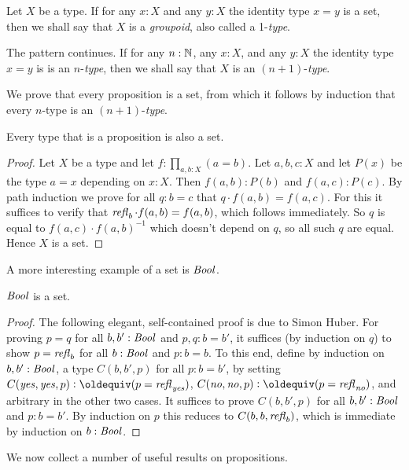 Let $X$ be a type.  If for any $x:X$ and any $y:X$ the identity type $x=y$ is a set, 
 then we shall say that $X$ is a \emph{groupoid}, also called a 1-\emph{type}.

The pattern continues.  If for any $n:\mathbb{N}$, any $x:X$, and any $y:X$ 
the identity type $x=y$ is is an $n$-\emph{type}, 
then we shall say that $X$ is an $(n+1)$-\emph{type}.

We prove that every proposition is a set, from which it follows
by induction that every $n$-type is an $(n+1)$-\emph{type}.

\begin{lemma}\label{lem:prop-is-set}
Every type that is a proposition is also a set.
\end{lemma}
\begin{proof}
Let $X$ be a type and let $f: \prod_{a,b:X} (a=b)$. Let $a,b,c : X$ and
let $P(x)$ be the type $a=x$ depending on $x:X$. Then
$f(a,b):P(b)$ and $f(a,c):P(c)$. By path induction we prove for
all $q:b=c$ that $q\cdot f(a,b) = f(a,c)$. For this it suffices to
verify that $\mathop{{\it refl}_{b}} \cdot f(a,b) = f(a,b)$, which follows immediately.
So $q$ is equal to $f(a,c)\cdot f(a,b)^{-1}$ which doesn't
depend on $q$, so all such $q$ are equal. Hence $X$ is a set.
\end{proof}

A more interesting example of a set is $\mathop{\mathit{Bool}}$.

\begin{lemma}\label{lem:isset-bool}
$\mathop{\mathit{Bool}}$ is a set.
\end{lemma}
\begin{proof}
The following elegant, self-contained proof is due to Simon Huber.
For proving $p=q$ for all $b,b':\mathop{\mathit{Bool}}$ and $p,q: b=b'$,
it suffices (by induction on $q$) to show
$p=\mathop{{\it refl}_{b}}$ for all $b:\mathop{\mathit{Bool}}$ and $p: b=b$.
To this end, define by induction on $b,b':\mathop{\mathit{Bool}}$,
a type $C(b,b',p)$ for all $p: b=b'$, by setting
$C(\yes,\yes,p)\defeq (p=\refl{\yes})$,
$C(\no,\no,p)\defeq (p=\refl{\no})$,
and arbitrary in the other two cases.
It suffices to prove $C(b,b',p)$ for all $b,b':\mathop{\mathit{Bool}}$
and $p: b=b'$. By induction on $p$ this reduces to
$C(b,b,\mathop{{\it refl}_{b}})$, which is immediate by induction on $b:\mathop{\mathit{Bool}}$.
\end{proof}

We now collect a number of useful results on propositions.

